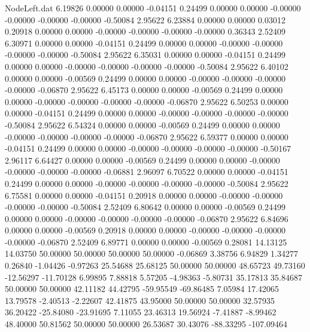 \begin{filecontents}{NodeLeft.dat}
   6.19826    0.00000    0.00000    -0.04151    0.24499    0.00000    0.00000   -0.00000   -0.00000   -0.00000   -0.00000   -0.50084    2.95622
   6.23884    0.00000    0.00000     0.03012    0.20918    0.00000    0.00000   -0.00000   -0.00000   -0.00000   -0.00000    0.36343    2.52409
   6.30971    0.00000    0.00000    -0.04151    0.24499    0.00000    0.00000   -0.00000   -0.00000   -0.00000   -0.00000   -0.50084    2.95622
   6.35031    0.00000    0.00000    -0.04151    0.24499    0.00000    0.00000   -0.00000   -0.00000   -0.00000   -0.00000   -0.50084    2.95622
   6.40102    0.00000    0.00000    -0.00569    0.24499    0.00000    0.00000   -0.00000   -0.00000   -0.00000   -0.00000   -0.06870    2.95622
   6.45173    0.00000    0.00000    -0.00569    0.24499    0.00000    0.00000   -0.00000   -0.00000   -0.00000   -0.00000   -0.06870    2.95622
   6.50253    0.00000    0.00000    -0.04151    0.24499    0.00000    0.00000   -0.00000   -0.00000   -0.00000   -0.00000   -0.50084    2.95622
   6.54324    0.00000    0.00000    -0.00569    0.24499    0.00000    0.00000   -0.00000   -0.00000   -0.00000   -0.00000   -0.06870    2.95622
   6.59377    0.00000    0.00000    -0.04151    0.24499    0.00000    0.00000   -0.00000   -0.00000   -0.00000   -0.00000   -0.50167    2.96117
   6.64427    0.00000    0.00000    -0.00569    0.24499    0.00000    0.00000   -0.00000   -0.00000   -0.00000   -0.00000   -0.06881    2.96097
   6.70522    0.00000    0.00000    -0.04151    0.24499    0.00000    0.00000   -0.00000   -0.00000   -0.00000   -0.00000   -0.50084    2.95622
   6.75581    0.00000    0.00000    -0.04151    0.20918    0.00000    0.00000   -0.00000   -0.00000   -0.00000   -0.00000   -0.50084    2.52409
   6.80642    0.00000    0.00000    -0.00569    0.24499    0.00000    0.00000   -0.00000   -0.00000   -0.00000   -0.00000   -0.06870    2.95622
   6.84696    0.00000    0.00000    -0.00569    0.20918    0.00000    0.00000   -0.00000   -0.00000   -0.00000   -0.00000   -0.06870    2.52409
   6.89771    0.00000    0.00000    -0.00569    0.28081   14.13125   14.03750   50.00000   50.00000   50.00000   50.00000   -0.06869    3.38756
   6.94829    1.34277    0.26840    -1.04426   -0.97263   25.54688   25.68125   50.00000   50.00000   48.65723   49.73160  -12.56297  -11.70128
   6.99895    7.88818    5.57205    -4.98363   -5.80731   35.17813   35.84687   50.00000   50.00000   42.11182   44.42795  -59.95549  -69.86485
   7.05984   17.42065   13.79578    -2.40513   -2.22607   42.41875   43.95000   50.00000   50.00000   32.57935   36.20422  -25.84080  -23.91695
   7.11055   23.46313   19.56924    -7.41887   -8.99462   48.40000   50.81562   50.00000   50.00000   26.53687   30.43076  -88.33295 -107.09464

\end{filecontents}
